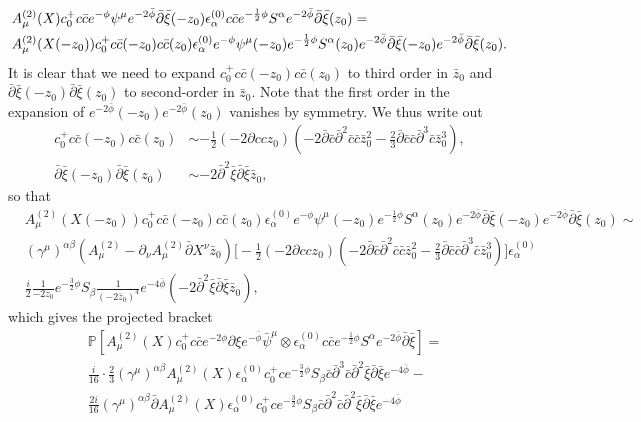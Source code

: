 \documentclass[12pt]{article}
\def\be{\begin{equation}}
\def\ee{\end{equation}}
\numberwithin{equation}{section}
\begin{document}
\begin{equation}
\be
\begin{aligned}
    &A^{(2)}_\mu(X) c_0^+ c\bar{c}e^{-\phi}\psi^\mu e^{-2\bar{\phi}}\bar{\partial}\bar{\xi} (-z_0) \epsilon^{(0)}_{\alpha} c\bar{c}e^{-\frac{1}{2}\phi} S^\alpha e^{-2\bar{\phi}}\bar{\partial}\bar{\xi}(z_0) = \\
    & A^{(2)}_\mu(X(-z_0)) c_0^+ c\bar{c}(-z_0) c\bar{c}(z_0)\epsilon^{(0)}_{\alpha} e^{-\phi}\psi^\mu(-z_0) e^{-\frac{1}{2}\phi}S^\alpha(z_0) e^{-2\bar{\phi}}\bar{\partial}\bar{\xi}(-z_0) e^{-2\bar{\phi}}\bar{\partial}\bar{\xi}(z_0).
\end{aligned}
\ee
It is clear that we need to expand $c_0^+ c\bar{c}(-z_0) c\bar{c}(z_0)$ to third order in $\bar{z}_0$ and $\bar{\partial}\bar{\xi}(-z_0)\bar{\partial}\bar{\xi}(z_0)$ to second-order in $\bar{z}_0$. Note that the first order in the expansion of $e^{-2\bar{\phi}}(-z_0)e^{-2\bar{\phi}}(z_0)$ vanishes by symmetry. We thus write out
\be
\begin{aligned}
    c_0^+ c\bar{c}(-z_0) c\bar{c}(z_0) & \sim -\frac{1}{2}(-2\partial c c z_0)(- 2 \bar{\partial}\bar{c}\bar{\partial}^2\bar{c}\bar{c}\bar{z}_0^2-\frac{2}{3}\bar{\partial}\bar{c}\bar{c}\bar{\partial}^3\bar{c} \bar{z}_0^3), \\
    \bar{\partial}\bar{\xi}(-z_0) \bar{\partial}\bar{\xi}(z_0) &\sim -2\bar{\partial}^2\bar{\xi}\bar{\partial}\bar{\xi} \bar{z}_0,
    \end{aligned}
\ee
so that
\be
\begin{aligned}
&A^{(2)}_\mu(X(-z_0)) c_0^+ c\bar{c}(-z_0) c\bar{c}(z_0)\epsilon^{(0)}_{\alpha} e^{-\phi}\psi^\mu(-z_0) e^{-\frac{1}{2}\phi}S^\alpha(z_0) e^{-2\bar{\phi}}\bar{\partial}\bar{\xi}(-z_0) e^{-2\bar{\phi}}\bar{\partial}\bar{\xi}(z_0) \sim \\
& (\gamma^\mu)^{\alpha\beta}(A^{(2)}_\mu - \partial_\nu A^{(2)}_\mu \bar{\partial}X^\nu \bar{z}_0)\big[-\frac{1}{2}(-2\partial c c z_0)(- 2 \bar{\partial}\bar{c}\bar{\partial}^2\bar{c}\bar{c}\bar{z}_0^2-\frac{2}{3}\bar{\partial}\bar{c}\bar{c}\bar{\partial}^3\bar{c} \bar{z}_0^3)\big]\epsilon^{(0)}_{\alpha} \\
&\frac{i}{2}\frac{1}{-2z_0}e^{-\frac{3}{2}\phi}S_\beta \frac{1}{(-2\bar{z}_0)^4} e^{-4\bar{\phi}}(-2\bar{\partial}^2\bar{\xi}\bar{\partial}\bar{\xi} \bar{z}_0),
\end{aligned}
\ee
which gives the projected bracket
\be
\begin{aligned}
&\mathbb{P}[A^{(2)}_\mu(X) c_0^+ c\bar{c} e^{-2\phi}\partial\xi e^{-\bar{\phi}} \bar{\psi}^\mu\otimes \epsilon^{(0)}_{\alpha} c\bar{c}e^{-\frac{1}{2}\phi} S^\alpha e^{-2\bar{\phi}}\bar{\partial}\bar{\xi}] = \\&\frac{i}{16} \cdot \frac{2}{3}(\gamma^\mu)^{\alpha \beta}A^{(2)}_\mu(X)\epsilon^{(0)}_{\alpha} c_0^+ c e^{-\frac{3}{2}\phi}S_\beta \bar{c}\bar{\partial}^3\bar{c}\bar{\partial}^2\bar{\xi}\bar{\partial}\bar{\xi}e^{-4\bar{\phi}}  - \\ & \frac{2i}{16} (\gamma^\mu)^{\alpha \beta}\bar{\partial}A^{(2)}_\mu(X)\epsilon^{(0)}_{\alpha} c_0^+ c e^{-\frac{3}{2}\phi}S_\beta \bar{c}\bar{\partial}^2\bar{c}\bar{\partial}^2\bar{\xi}\bar{\partial}\bar{\xi}e^{-4\bar{\phi}}

\end{aligned}
\end{equation}
\end{document}
